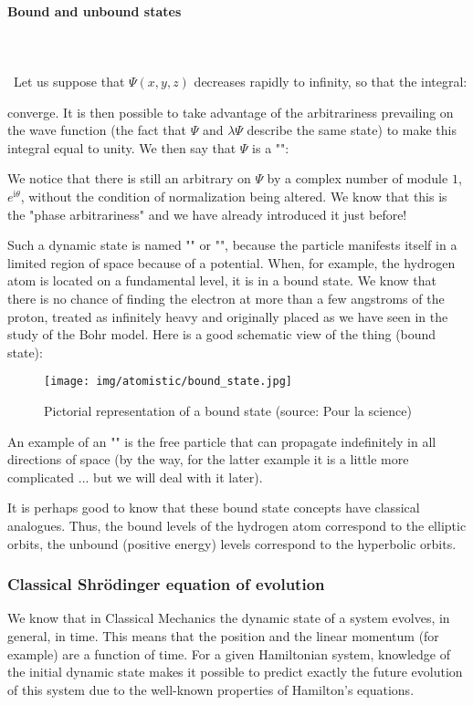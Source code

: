 	\paragraph{Bound and unbound states}\mbox{}\\\\\
	Let us suppose that $\Psi(x,y,z)$ decreases rapidly to infinity, so that the integral:
	
	converge. It is then possible to take advantage of the arbitrariness prevailing on the wave function (the fact that $\Psi$ and $\lambda\Psi$ describe the same state) to make this integral equal to unity. We then say that $\Psi$ is a "":
	
	We notice that there is still an arbitrary on $\Psi$ by a complex number of module $1$, $e^{\mathrm{i}\theta}$, without the condition of normalization being altered. We know that this is the "phase arbitrariness" and we have already introduced it just before!
	
	Such a dynamic state is named "" or "", because the particle manifests itself in a limited region of space because of a potential. When, for example, the hydrogen atom is located on a fundamental level, it is in a bound state. We know that there is no chance of finding the electron at more than a few angstroms of the proton, treated as infinitely heavy and originally placed as we have seen in the study of the Bohr model. Here is a good schematic view of the thing (bound state):
	\begin{figure}[H]
		\centering
		\texttt{[image: img/atomistic/bound\_state.jpg]}	
		\caption[Pictorial representation of a bound state]{Pictorial representation of a bound state (source: Pour la science)}
	\end{figure}
	An example of an "" is the free particle that can propagate indefinitely in all directions of space (by the way, for the latter example it is a little more complicated ... but we will deal with it later).
	\begin{tcolorbox}[title=Remark,colframe=black,arc=10pt]
	It is perhaps good to know that these bound state concepts have classical analogues. Thus, the bound levels of the hydrogen atom correspond to the elliptic orbits, the unbound (positive energy) levels correspond to the hyperbolic orbits.
	\end{tcolorbox}
	
	\subsubsection{Classical Shrödinger equation of evolution}
	We know that in Classical Mechanics the dynamic state of a system evolves, in general, in time. This means that the position and the linear momentum (for example) are a function of time. For a given Hamiltonian system, knowledge of the initial dynamic state makes it possible to predict exactly the future evolution of this system due to the well-known properties of Hamilton's equations.
	
